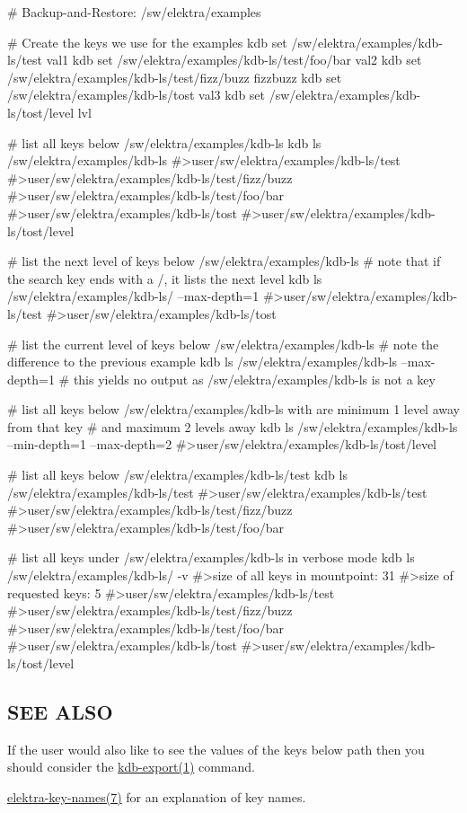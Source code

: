 \begin{DoxyCode}
# Backup-and-Restore: /sw/elektra/examples

# Create the keys we use for the examples
kdb set /sw/elektra/examples/kdb-ls/test val1
kdb set /sw/elektra/examples/kdb-ls/test/foo/bar val2
kdb set /sw/elektra/examples/kdb-ls/test/fizz/buzz fizzbuzz
kdb set /sw/elektra/examples/kdb-ls/tost val3
kdb set /sw/elektra/examples/kdb-ls/tost/level lvl

# list all keys below /sw/elektra/examples/kdb-ls
kdb ls /sw/elektra/examples/kdb-ls
#>user/sw/elektra/examples/kdb-ls/test
#>user/sw/elektra/examples/kdb-ls/test/fizz/buzz
#>user/sw/elektra/examples/kdb-ls/test/foo/bar
#>user/sw/elektra/examples/kdb-ls/tost
#>user/sw/elektra/examples/kdb-ls/tost/level

# list the next level of keys below /sw/elektra/examples/kdb-ls
# note that if the search key ends with a /, it lists the next level
kdb ls /sw/elektra/examples/kdb-ls/ --max-depth=1
#>user/sw/elektra/examples/kdb-ls/test
#>user/sw/elektra/examples/kdb-ls/tost

# list the current level of keys below /sw/elektra/examples/kdb-ls
# note the difference to the previous example
kdb ls /sw/elektra/examples/kdb-ls --max-depth=1
# this yields no output as /sw/elektra/examples/kdb-ls is not a key

# list all keys below /sw/elektra/examples/kdb-ls with are minimum 1 level away from that key
# and maximum 2 levels away
kdb ls /sw/elektra/examples/kdb-ls --min-depth=1 --max-depth=2
#>user/sw/elektra/examples/kdb-ls/tost/level

# list all keys below /sw/elektra/examples/kdb-ls/test
kdb ls /sw/elektra/examples/kdb-ls/test
#>user/sw/elektra/examples/kdb-ls/test
#>user/sw/elektra/examples/kdb-ls/test/fizz/buzz
#>user/sw/elektra/examples/kdb-ls/test/foo/bar

# list all keys under /sw/elektra/examples/kdb-ls in verbose mode
kdb ls /sw/elektra/examples/kdb-ls/ -v
#>size of all keys in mountpoint: 31
#>size of requested keys: 5
#>user/sw/elektra/examples/kdb-ls/test
#>user/sw/elektra/examples/kdb-ls/test/fizz/buzz
#>user/sw/elektra/examples/kdb-ls/test/foo/bar
#>user/sw/elektra/examples/kdb-ls/tost
#>user/sw/elektra/examples/kdb-ls/tost/level
\end{DoxyCode}


\subsection*{S\+EE A\+L\+SO}


\begin{DoxyItemize}
\item If the user would also like to see the values of the keys below {\ttfamily path} then you should consider the \hyperlink{md_doc_help_kdb-export_doc_help_kdb-export_md}{kdb-\/export(1)} command.
\item \hyperlink{md_doc_help_elektra-key-names_doc_help_elektra-key-names_md}{elektra-\/key-\/names(7)} for an explanation of key names. 
\end{DoxyItemize}